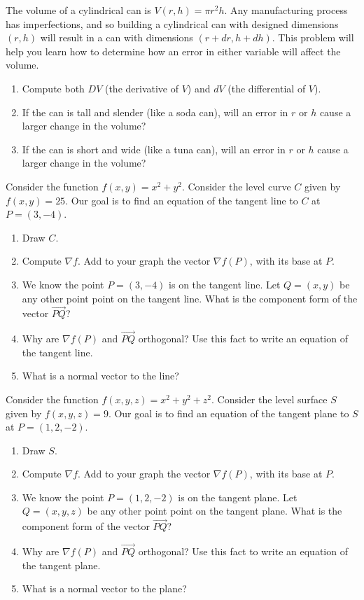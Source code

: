 \begin{problem}
The volume of a cylindrical can is $V(r,h)=\pi r^2 h$. Any manufacturing process has imperfections, and so building a cylindrical can with designed dimensions $(r,h)$ will result in a can with dimensions $(r+dr,h+dh)$. This problem will help you learn how to determine how an error in either variable will affect the volume.
\begin{enumerate}
 \item Compute both $DV$ (the derivative of $V$) and $dV$ (the differential of $V$).
 \item If the can is tall and slender (like a soda can), will an error in $r$ or $h$ cause a larger change in the volume? 
 \item If the can is short and wide (like a tuna can), will an error in $r$ or $h$ cause a larger change in the volume? 

\end{enumerate}
\end{problem}

\begin{problem}
 Consider the function $f(x,y)=x^2+y^2$.  Consider the level curve $C$ given by $f(x,y)=25$. Our goal is to find an equation of the tangent line to $C$ at $P=(3,-4)$.
 \begin{enumerate}
  \item Draw $C$.
  \item Compute $\nabla f$. Add to your graph the vector $\nabla f(P)$, with its base at $P$. 
  \item We know the point $P=(3,-4)$ is on the tangent line. Let $Q=(x,y)$ be any other point point on the tangent line.  What is the component form of the vector $\vec {PQ}$?
  \item Why are  $\nabla f(P)$ and $\vec{PQ}$ orthogonal? Use this fact to write an equation of the tangent line.
  \item What is a normal vector to the line?
 \end{enumerate}

\end{problem}


\begin{problem}
 Consider the function $f(x,y,z)=x^2+y^2+z^2$.  Consider the level surface $S$ given by $f(x,y,z)=9$. Our goal is to find an equation of the tangent plane to $S$ at $P=(1,2,-2)$.
 \begin{enumerate}
  \item Draw $S$.
  \item Compute $\nabla f$. Add to your graph the vector $\nabla f(P)$, with its base at $P$. 
  \item We know the point $P=(1,2,-2)$ is on the tangent plane. Let $Q=(x,y,z)$ be any other point point on the tangent plane.  What is the component form of the vector $\vec {PQ}$?
  \item Why are  $\nabla f(P)$ and $\vec{PQ}$ orthogonal? Use this fact to write an equation of the tangent plane.
  \item What is a normal vector to the plane?
 \end{enumerate}
\end{problem}

